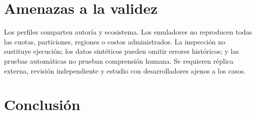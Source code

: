\documentclass[12pt]{article}
\begin{document}
\section{Amenazas a la validez}



Los perfiles comparten autoría y ecosistema. Los emuladores no reproducen todas las
cuotas, particiones, regiones o costos administrados. La inspección no sustituye
ejecución; los datos sintéticos pueden omitir errores históricos; y las pruebas
automáticas no prueban comprensión humana. Se requieren réplica externa, revisión
independiente y estudio con desarrolladores ajenos a los casos.

\section{Conclusión}

\COBRIAConclusionCientifica

\printbibliography
\end{document}
